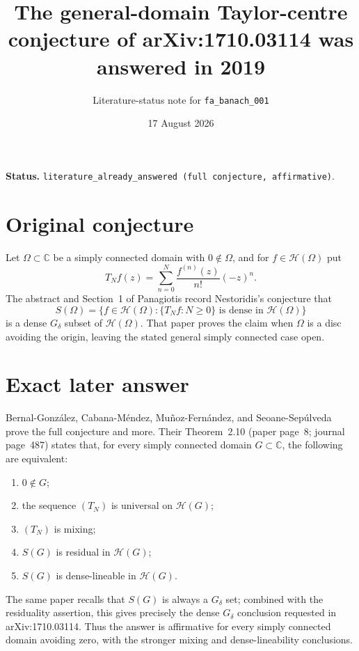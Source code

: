 \documentclass[11pt]{article}
\title{The general-domain Taylor-centre conjecture of arXiv:1710.03114 was answered in 2019}
\author{Literature-status note for \texttt{fa\_banach\_001}}
\date{17 August 2026}
\begin{document}
\maketitle

\noindent\textbf{Status.}
\texttt{literature\_already\_answered (full conjecture, affirmative)}.

\section*{Original conjecture}

Let $\Omega\subset\mathbb C$ be a simply connected domain with
$0\notin\Omega$, and for $f\in\mathcal H(\Omega)$ put
\[
 T_Nf(z)=\sum_{n=0}^{N}\frac{f^{(n)}(z)}{n!}(-z)^n.
\]
The abstract and Section~1 of Panagiotis \cite{Panagiotis2019} record
Nestoridis's conjecture that
\[
 S(\Omega)=\{f\in\mathcal H(\Omega):\{T_Nf:N\geq0\}
                   \text{ is dense in }\mathcal H(\Omega)\}
\]
is a dense $G_\delta$ subset of $\mathcal H(\Omega)$.  That paper proves the
claim when $\Omega$ is a disc avoiding the origin, leaving the stated general
simply connected case open.

\section*{Exact later answer}

Bernal-Gonz\'alez, Cabana-M\'endez, Mu\~noz-Fern\'andez, and
Seoane-Sep\'ulveda \cite{BCMS2019} prove the full conjecture and more.
Their Theorem~2.10 (paper page~8; journal page~487) states that, for every
simply connected domain $G\subset\mathbb C$, the following are equivalent:
\begin{enumerate}
  \item $0\notin G$;
  \item the sequence $(T_N)$ is universal on $\mathcal H(G)$;
  \item $(T_N)$ is mixing;
  \item $S(G)$ is residual in $\mathcal H(G)$;
  \item $S(G)$ is dense-lineable in $\mathcal H(G)$.
\end{enumerate}
The same paper recalls that $S(G)$ is always a $G_\delta$ set; combined with
the residuality assertion, this gives precisely the dense $G_\delta$
conclusion requested in arXiv:1710.03114.  Thus the answer is
affirmative for every simply connected domain avoiding zero, with the stronger
mixing and dense-lineability conclusions.
\end{document}
